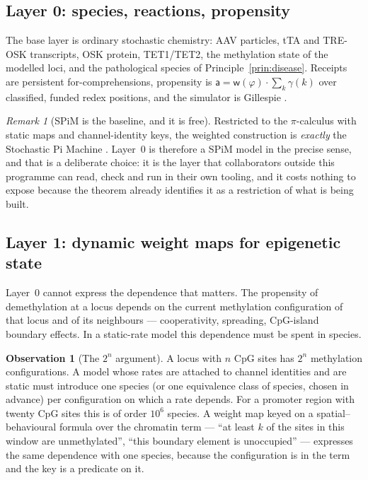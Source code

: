 \documentclass[11pt,a4paper]{article}
\theoremstyle{plain}
\theoremstyle{definition}
\newtheorem{observation}[theorem]{Observation}
\theoremstyle{remark}
\newtheorem{remark}[theorem]{Remark}
\newcommand{\wmap}{\mathsf{w}}
\newcommand{\prop}{\mathsf{a}}
\begin{document}
\subsection{Layer 0: species, reactions, propensity}

The base layer is ordinary stochastic chemistry: AAV particles, tTA and TRE-OSK
transcripts, OSK protein, TET1/TET2, the methylation state of the modelled
loci, and the pathological species of Principle~\ref{prin:disease}. Receipts
are persistent for-comprehensions, propensity is
$\prop = \wmap(\varphi)\cdot\sum_{k}\gamma(k)$ over classified, funded redex
positions, and the simulator is Gillespie \cite{Gillespie,WeightedGSLT}.

\begin{remark}[SPiM is the baseline, and it is free]\label{rem:spim}
Restricted to the $\pi$-calculus with static maps and channel-identity keys,
the weighted construction is \emph{exactly} the Stochastic Pi Machine
\cite{WeightedGSLT,PhillipsCardelli}. Layer~0 is therefore a SPiM model in the
precise sense, and that is a deliberate choice: it is the layer that
collaborators outside this programme can read, check and run in their own
tooling, and it costs nothing to expose because the theorem already identifies
it as a restriction of what is being built.
\end{remark}

\subsection{Layer 1: dynamic weight maps for epigenetic state}

Layer~0 cannot express the dependence that matters. The propensity of
demethylation at a locus depends on the current methylation configuration of
that locus and of its neighbours --- cooperativity, spreading, CpG-island
boundary effects. In a static-rate model this dependence must be spent in
species.

\begin{observation}[The $2^n$ argument]\label{obs:blowup}
A locus with $n$ CpG sites has $2^n$ methylation configurations. A model whose
rates are attached to channel identities and are static must introduce one
species (or one equivalence class of species, chosen in advance) per
configuration on which a rate depends. For a promoter region with twenty CpG
sites this is of order $10^{6}$ species. A weight map keyed on a
spatial--behavioural formula over the chromatin term --- ``at least $k$ of the
sites in this window are unmethylated'', ``this boundary element is
unoccupied'' --- expresses the same dependence with one species, because the
configuration is in the term and the key is a predicate on it.
\end{observation}
\end{document}
